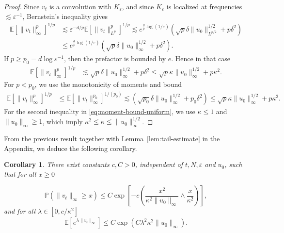 \documentclass[a4paper,12pt]{article}
\newtheorem{corollary}[theorem]{Corollary}
\begin{document}
\begin{proof}
  Since $v_t$ is a convolution with $K_{\varepsilon}$, and since $K_{\varepsilon}$ is localized at frequencies $\lesssim \varepsilon^{-1}$, 
  Bernstein's inequality \cite[Lemma 2.1]{Bahouri2011} gives
  \begin{align*}
        \mathbb{E} [\| v_t \|_{\infty}^p]^{1 / p} &\lesssim \varepsilon^{- d / p}
     \mathbb{E} [\| v_t \|_{L^p}^p]^{1 / p} \lesssim e^{\tfrac{d}{p} \log(1/\varepsilon)} \left(
     \sqrt{p} \delta \| u_0 \|_{L^{p / 2}}^{1 / 2} + p \delta^2 \right) \\
     &\leq
     e^{\tfrac{d}{p} \log(1/\varepsilon)} \left( \sqrt{p} \delta \| u_0 \|_{\infty}^{1 / 2} + p
     \delta^2 \right).
    \end{align*}
  If $p \geq p_0 = d \log \varepsilon^{- 1}$, then the prefactor is
  bounded by $e$. 
  Hence in that case
  \begin{align*}
         \mathbb{E} [\| v_t \|_{\infty}^p]^{1 / p} &\lesssim
  \sqrt{p} \delta \| u_0 \|_{\infty}^{1 / 2} + p
     \delta^2 \leq \sqrt{p} \kappa \|u_0\|_\infty^{1/2} + p \kappa^2.
    \end{align*}
  For $p < p_0$, we use the monotonicity of moments and bound
  \begin{align*}
        \mathbb{E} [\| v_t \|_{\infty}^p]^{1 / p} &\leq \mathbb{E} [\| v_t
     \|_{\infty}^{p_0}]^{1 / (p_0)}\lesssim \left( \sqrt{p_0} \delta \|
     u_0 \|_{\infty}^{1 / 2} + p_0 \delta^2 \right) \leq \sqrt{p} \kappa \|u_0\|_\infty^{1/2} + p \kappa^2.
     \end{align*}
For the second inequality in \eqref{eq:moment-bound-uniform}, we use $\kappa \leq 1$ and $\|u_0\|_\infty \geq 1$, which imply $ \kappa^2 \leq \kappa \leq  \|u_0\|_\infty^{1/2}$. 
\end{proof}

From the previous result together with Lemma~\ref{lem:tail-estimate} in the Appendix, we deduce the following corollary.
\begin{corollary}
  \label{cor:v-uniform-tails} 
  There exist constants $c,C>0$, independent of $t,N, \varepsilon$ and $u_0$, such that for all $x\geq 0$

 \begin{equation}
      \mathbb{P} (\| v_t \|_{\infty} \geq x) \leq C \exp \left[ -c \left( \frac{x^2}{\kappa^2\|u_0\|_\infty } \wedge \frac{x}{\kappa^2}\right)\right],
 \end{equation}
 and for all $\lambda \in
  [0, c / \kappa^2]$
  \begin{equation} \label{eq:exp-moments-v}
       \mathbb{E} [e^{\lambda \| v_t \|_{\infty}}] \leq C \exp ( C \lambda^2 \kappa^2 \|u_0\|_\infty). 
  \end{equation}
\end{corollary}
\end{document}
